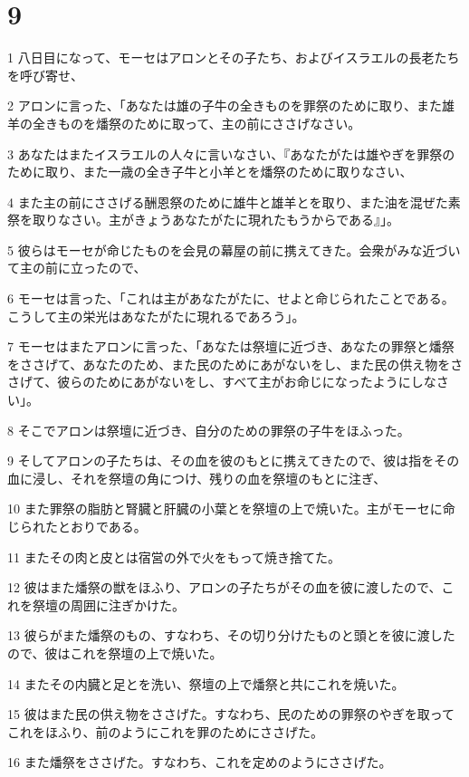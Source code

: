 \chapter{9}

\par 1 八日目になって、モーセはアロンとその子たち、およびイスラエルの長老たちを呼び寄せ、
\par 2 アロンに言った、「あなたは雄の子牛の全きものを罪祭のために取り、また雄羊の全きものを燔祭のために取って、主の前にささげなさい。
\par 3 あなたはまたイスラエルの人々に言いなさい、『あなたがたは雄やぎを罪祭のために取り、また一歳の全き子牛と小羊とを燔祭のために取りなさい、
\par 4 また主の前にささげる酬恩祭のために雄牛と雄羊とを取り、また油を混ぜた素祭を取りなさい。主がきょうあなたがたに現れたもうからである』」。
\par 5 彼らはモーセが命じたものを会見の幕屋の前に携えてきた。会衆がみな近づいて主の前に立ったので、
\par 6 モーセは言った、「これは主があなたがたに、せよと命じられたことである。こうして主の栄光はあなたがたに現れるであろう」。
\par 7 モーセはまたアロンに言った、「あなたは祭壇に近づき、あなたの罪祭と燔祭をささげて、あなたのため、また民のためにあがないをし、また民の供え物をささげて、彼らのためにあがないをし、すべて主がお命じになったようにしなさい」。
\par 8 そこでアロンは祭壇に近づき、自分のための罪祭の子牛をほふった。
\par 9 そしてアロンの子たちは、その血を彼のもとに携えてきたので、彼は指をその血に浸し、それを祭壇の角につけ、残りの血を祭壇のもとに注ぎ、
\par 10 また罪祭の脂肪と腎臓と肝臓の小葉とを祭壇の上で焼いた。主がモーセに命じられたとおりである。
\par 11 またその肉と皮とは宿営の外で火をもって焼き捨てた。
\par 12 彼はまた燔祭の獣をほふり、アロンの子たちがその血を彼に渡したので、これを祭壇の周囲に注ぎかけた。
\par 13 彼らがまた燔祭のもの、すなわち、その切り分けたものと頭とを彼に渡したので、彼はこれを祭壇の上で焼いた。
\par 14 またその内臓と足とを洗い、祭壇の上で燔祭と共にこれを焼いた。
\par 15 彼はまた民の供え物をささげた。すなわち、民のための罪祭のやぎを取ってこれをほふり、前のようにこれを罪のためにささげた。
\par 16 また燔祭をささげた。すなわち、これを定めのようにささげた。
